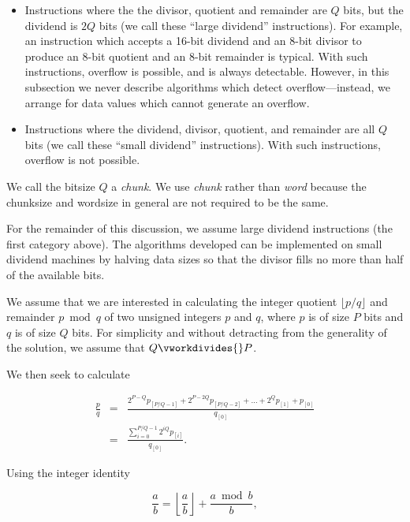 \begin{itemize}
\item Instructions where the the divisor, quotient and remainder are
      $Q$ bits, but the dividend is $2Q$ bits (we call these
      ``large dividend'' instructions).  For example, an
      instruction which accepts a 16-bit dividend and an
      8-bit divisor to produce an 8-bit quotient and an 8-bit remainder is
      typical.
      With such instructions, overflow is possible, and is always detectable.
      However, in this subsection we never describe algorithms which detect
      overflow---instead, we arrange for data values which cannot generate an
      overflow.
\item Instructions where the dividend, divisor, quotient, and remainder
      are all $Q$ bits (we call these ``small dividend'' instructions).  
      With such instructions, overflow is not possible.
\end{itemize}

We call the bitsize $Q$ a \emph{chunk}.  We use \emph{chunk} rather than
\emph{word} because the chunksize and wordsize in general are not
required to be the same.

For the remainder of this discussion, we assume large dividend 
instructions (the first category above).
The algorithms developed can be implemented on small dividend machines
by halving data sizes so that the divisor fills no more than half
of the available bits.

We assume that we are interested in calculating the integer quotient 
$\lfloor{}p/q\rfloor$ and remainder $p \bmod{} q$ of two unsigned
integers $p$ and $q$, where $p$ is of size $P$ bits and $q$ is
of size $Q$ bits.  For simplicity and without detracting from the
generality of the solution, we assume that $Q \vworkdivides{} P$.

We then seek to calculate

\begin{eqnarray}
\label{eq:ccil0:sidv0:sldm0:001}
\frac{p}{q} & = & \frac{2^{P-Q} p_{[P/Q-1]} + 2^{P-2Q} p_{[P/Q-2]} + \ldots{} + 2^{Q} p_{[1]} + p_{[0]}}{q_{[0]}} \\
\nonumber       & = & \frac{\sum_{i=0}^{P/Q-1} 2^{iQ} p_{[i]}}{q_{[0]}} .
\end{eqnarray}

\noindent{}Using the integer identity

\begin{equation}
\label{eq:ccil0:sidv0:sldm0:002}
\frac{a}{b} = \left\lfloor{\frac{a}{b}}\right\rfloor + \frac{a \bmod b}{b} ,
\end{equation}

